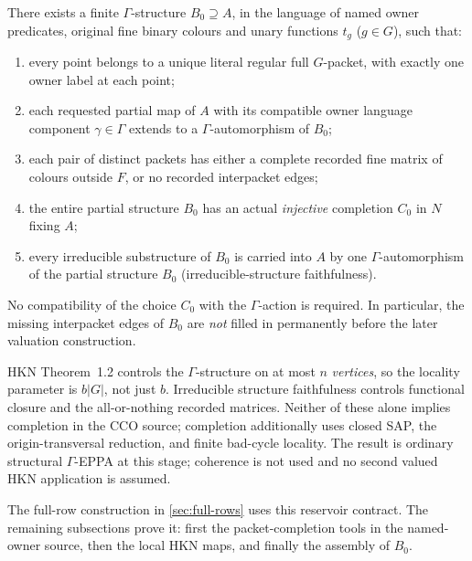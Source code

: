 \begin{theorem}
\label{thm:completable-reservoir}
There exists a finite $\Gamma$-structure $B_0\supseteq A$, in the
language of named owner predicates, original fine binary colours
and unary functions $t_g$ ($g\in G$), such that:
\begin{enumerate}
\item every point belongs to a unique literal regular full
      $G$-packet, with exactly one owner label at each point;
\item each requested partial map of $A$ with its compatible owner
      language component $\gamma\in\Gamma$ extends to a
      $\Gamma$-automorphism of $B_0$;
\item each pair of distinct packets has either a complete recorded
      fine matrix of colours outside $F$, or no recorded interpacket
      edges;
\item the entire partial structure $B_0$ has an actual
      \emph{injective} completion $C_0$ in $N$ fixing $A$;
\item every irreducible substructure of $B_0$ is carried into
      $A$ by one $\Gamma$-automorphism of the partial structure
      $B_0$ (irreducible-structure faithfulness).
\end{enumerate}
No compatibility of the choice $C_0$ with the $\Gamma$-action is
required.  In particular, the missing interpacket edges of $B_0$
are \emph{not} filled in permanently before the later valuation
construction.
\end{theorem}

\begin{remark}
HKN Theorem~1.2 controls the $\Gamma$-structure on at most
$n$ \emph{vertices}, so the locality parameter is
$b|G|$, not just $b$.  Irreducible structure faithfulness
controls functional closure and the all-or-nothing recorded
matrices.  Neither of these alone implies completion in the
CCO source; completion additionally uses closed SAP, the
origin-transversal reduction, and finite bad-cycle locality.
The result is ordinary structural $\Gamma$-EPPA at this stage;
coherence is not used and no second valued HKN application is
assumed.
\end{remark}

The full-row construction in \cref{sec:full-rows} uses this reservoir
contract. The remaining subsections prove it: first the packet-completion
tools in the named-owner source, then the local HKN maps, and finally
the assembly of $B_0$.

